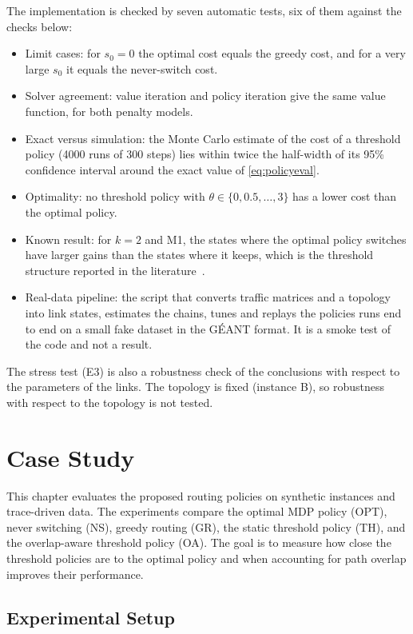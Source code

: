 \documentclass{amsart}
\begin{document}
The implementation is checked by seven automatic tests, six of them against the checks below:
\begin{itemize}
  \item Limit cases: for $s_0 = 0$ the optimal cost equals the greedy cost, and for a very large $s_0$ it equals the never-switch cost.
  \item Solver agreement: value iteration and policy iteration give the same value function, for both penalty models.
  \item Exact versus simulation: the Monte Carlo estimate of the cost of a threshold policy (4000 runs of 300 steps) lies within twice the half-width of its 95\% confidence interval around the exact value of \eqref{eq:policyeval}.
  \item Optimality: no threshold policy with $\theta \in \{0, 0.5, \dots, 3\}$ has a lower cost than the optimal policy.
  \item Known result: for $k = 2$ and M1, the states where the optimal policy switches have larger gains than the states where it keeps, which is the threshold structure reported in the literature~\cite{anjali2002,hamouda2020}.
  \item Real-data pipeline: the script that converts traffic matrices and a topology into link states, estimates the chains, tunes and replays the policies runs end to end on a small fake dataset in the G\'{E}ANT format. It is a smoke test of the code and not a result.
\end{itemize}
The stress test (E3) is also a robustness check of the conclusions with respect to the parameters of the links. The topology is fixed (instance B), so robustness with respect to the topology is not tested.

\section{Case Study}
\label{sec:case-study}

This chapter evaluates the proposed routing policies on synthetic
instances and trace-driven data. The experiments compare the optimal
MDP policy (OPT), never switching (NS), greedy routing (GR), the
static threshold policy (TH), and the overlap-aware threshold policy
(OA). The goal is to measure how close the threshold policies are to
the optimal policy and when accounting for path overlap improves
their performance.

\subsection{Experimental Setup}
\end{document}
